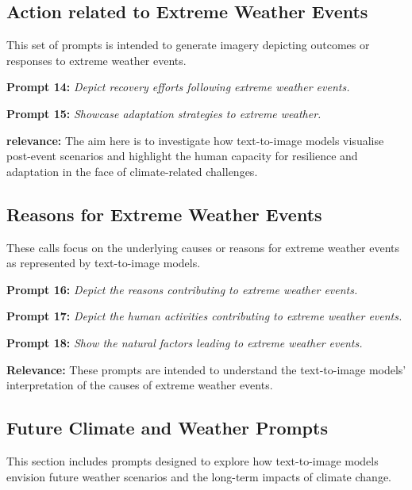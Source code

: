 \subsection{Action related to Extreme Weather Events}
This set of prompts is intended to generate imagery depicting outcomes or responses to extreme weather events.

\begin{description}
\item \textbf{Prompt 14:} \textit{Depict recovery efforts following extreme weather events.}
\item \textbf{Prompt 15:} \textit{Showcase adaptation strategies to extreme weather.}
\end{description}
\textbf{relevance:} The aim here is to investigate how text-to-image models visualise post-event scenarios and highlight the human capacity for resilience and adaptation in the face of climate-related challenges.

\subsection{Reasons for Extreme Weather Events}
These calls focus on the underlying causes or reasons for extreme weather events as represented by text-to-image models.

\begin{description}
\item \textbf{Prompt 16:} \textit{Depict the reasons contributing to extreme weather events.}
\item \textbf{Prompt 17:} \textit{Depict the human activities contributing to extreme weather events.}
\item \textbf{Prompt 18:} \textit{Show the natural factors leading to extreme weather events.}
\end{description}
\textbf{Relevance:} These prompts are intended to understand the text-to-image models' interpretation of the causes of extreme weather events.

\subsection{Future Climate and Weather Prompts}
This section includes prompts designed to explore how text-to-image models envision future weather scenarios and the long-term impacts of climate change.

